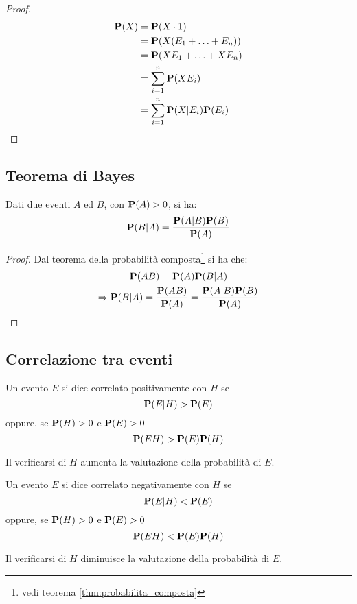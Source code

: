 \begin{proof}
  \begin{align*}
    \mathbf{P}(X) &= \mathbf{P}(X \cdot 1) \\
    &= \mathbf{P}(X(E_1 + \ldots + E_n)) \\
    &= \mathbf{P}(XE_1 + \ldots + XE_n) \\
    &= \sum_{i=1}^{n} \mathbf{P}(XE_i) \\
    &= \sum_{i=1}^{n} \mathbf{P}(X|E_i)\mathbf{P}(E_i)
  \end{align*}
\end{proof}

\subsection{Teorema di Bayes}
\begin{theorem}
  Dati due eventi $A$ ed $B$, con \( \mathbf{P}(A) > 0 \), si ha:
  \[ \mathbf{P}(B|A) = \frac{\mathbf{P}(A|B)\mathbf{P}(B)}{\mathbf{P}(A)} \]
\end{theorem}

\begin{proof}
  Dal teorema della probabilità composta\footnote{vedi teorema \ref{thm:probabilita_composta}} si ha che:
  \begin{gather*}
    \mathbf{P}(AB) = \mathbf{P}(A)\mathbf{P}(B|A) \\
    \Rightarrow \mathbf{P}(B|A) = \frac{\mathbf{P}(AB)}{\mathbf{P}(A)} = \frac{\mathbf{P}(A|B)\mathbf{P}(B)}{\mathbf{P}(A)}
  \end{gather*}
\end{proof}

\subsection{Correlazione tra eventi}
\begin{definition}
  \label{def:eventi_correlati_positivamente}
  Un evento $E$ si dice correlato positivamente con $H$ se
  \[ \mathbf{P}(E|H) > \mathbf{P}(E) \]
  oppure, se \( \mathbf{P}(H) > 0 \) e \( \mathbf{P}(E) > 0 \)
  \[ \mathbf{P}(EH) > \mathbf{P}(E)\mathbf{P}(H) \]

  Il verificarsi di $H$ aumenta la valutazione della probabilità di $E$.
\end{definition}

\begin{definition}
  \label{def:eventi_correlati_negativamente}
  Un evento $E$ si dice correlato negativamente con $H$ se
  \[ \mathbf{P}(E|H) < \mathbf{P}(E) \]
  oppure, se \( \mathbf{P}(H) > 0 \) e \( \mathbf{P}(E) > 0 \)
  \[ \mathbf{P}(EH) < \mathbf{P}(E)\mathbf{P}(H) \]

  Il verificarsi di $H$ diminuisce la valutazione della probabilità di $E$.
\end{definition}

